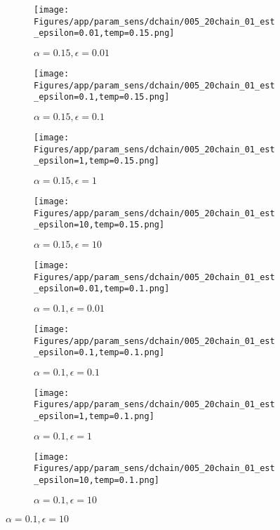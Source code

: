 \documentclass{article}
\theoremstyle{plain}
\begin{document}
\begin{appendices}
\begin{figure}
                \begin{subfigure}[b]{0.24\textwidth}
                    \centering
                    \texttt{[image: Figures/app/param\_sens/dchain/005\_20chain\_01\_est\_epsilon=0.01,temp=0.15.png]}
                    \caption*{$\alpha=0.15,\epsilon=0.01$}
                \end{subfigure}
                \begin{subfigure}[b]{0.24\textwidth}
                    \centering
                    \texttt{[image: Figures/app/param\_sens/dchain/005\_20chain\_01\_est\_epsilon=0.1,temp=0.15.png]}
                    \caption*{$\alpha=0.15,\epsilon=0.1$}
                \end{subfigure}
                \begin{subfigure}[b]{0.24\textwidth}
                    \centering
                    \texttt{[image: Figures/app/param\_sens/dchain/005\_20chain\_01\_est\_epsilon=1,temp=0.15.png]}
                    \caption*{$\alpha=0.15,\epsilon=1$}
                \end{subfigure}
                \begin{subfigure}[b]{0.24\textwidth}
                    \centering
                    \texttt{[image: Figures/app/param\_sens/dchain/005\_20chain\_01\_est\_epsilon=10,temp=0.15.png]}
                    \caption*{$\alpha=0.15,\epsilon=10$}
                \end{subfigure}
                
                \begin{subfigure}[b]{0.24\textwidth}
                    \centering
                    \texttt{[image: Figures/app/param\_sens/dchain/005\_20chain\_01\_est\_epsilon=0.01,temp=0.1.png]}
                    \caption*{$\alpha=0.1,\epsilon=0.01$}
                \end{subfigure}
                \begin{subfigure}[b]{0.24\textwidth}
                    \centering
                    \texttt{[image: Figures/app/param\_sens/dchain/005\_20chain\_01\_est\_epsilon=0.1,temp=0.1.png]}
                    \caption*{$\alpha=0.1,\epsilon=0.1$}
                \end{subfigure}
                \begin{subfigure}[b]{0.24\textwidth}
                    \centering
                    \texttt{[image: Figures/app/param\_sens/dchain/005\_20chain\_01\_est\_epsilon=1,temp=0.1.png]}
                    \caption*{$\alpha=0.1,\epsilon=1$}
                \end{subfigure}
                \begin{subfigure}[b]{0.24\textwidth}
                    \centering
                    \texttt{[image: Figures/app/param\_sens/dchain/005\_20chain\_01\_est\_epsilon=10,temp=0.1.png]}
                    \caption*{$\alpha=0.1,\epsilon=10$}
                \end{subfigure}
                

\end{figure}
\end{appendices}
\end{document}
